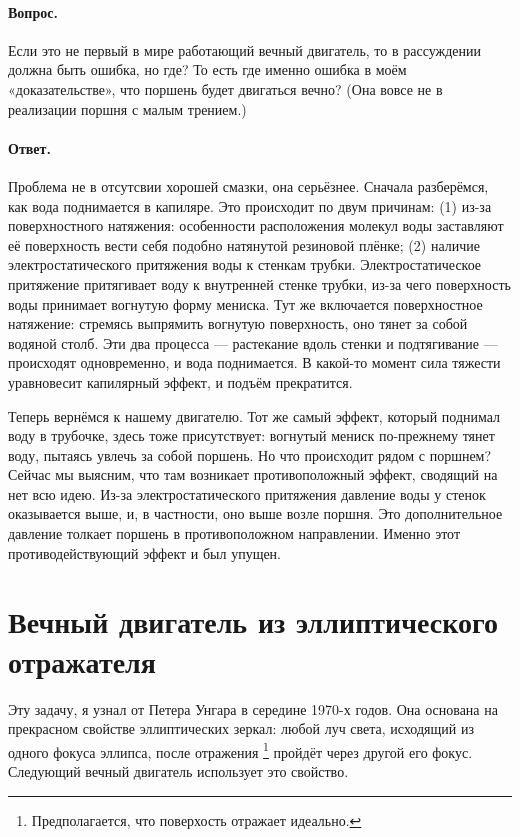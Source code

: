 \paragraph{Вопрос.}
Если это не первый в мире работающий вечный двигатель, то в рассуждении должна быть ошибка, но где?
То есть где именно ошибка в моём «доказательстве», что поршень будет двигаться вечно?
(Она вовсе не в реализации поршня с малым трением.)

\paragraph{Ответ.}
Проблема не в отсутсвии хорошей смазки, она серьёзнее.
Сначала разберёмся, как вода поднимается в капиляре.
Это происходит по двум причинам:
(1) из-за поверхностного натяжения:
особенности расположения молекул воды заставляют её поверхность вести себя подобно натянутой резиновой плёнке;
(2) наличие электростатического притяжения воды к стенкам трубки.
Электростатическое притяжение притягивает воду к внутренней стенке трубки, из-за чего поверхность воды принимает вогнутую форму мениска.
Тут же включается поверхностное натяжение: стремясь выпрямить вогнутую поверхность, оно тянет за собой водяной столб.
Эти два процесса --- растекание вдоль стенки и подтягивание --- происходят одновременно, и вода поднимается.
В какой-то момент сила тяжести уравновесит капилярный эффект, и подъём прекратится.

Теперь вернёмся к нашему двигателю.
Тот же самый эффект, который поднимал воду в трубочке, здесь тоже присутствует: вогнутый мениск по-прежнему тянет воду, пытаясь увлечь за собой поршень.
Но что происходит рядом с поршнем?
Сейчас мы выясним, что там возникает противоположный эффект, сводящий на нет всю идею.
Из-за электростатического притяжения давление воды у стенок оказывается выше, и, в частности, оно выше возле поршня.
Это дополнительное давление толкает поршень в противоположном направлении.
Именно этот противодействующий эффект и был упущен.

\section{Вечный двигатель из эллиптического отражателя}

Эту задачу, я узнал от Петера Унгара в середине
1970-х годов.
Она основана на прекрасном свойстве эллиптических зеркал:
любой луч света, исходящий из одного фокуса эллипса,
после отражения%
\footnote{Предполагается, что поверхость отражает идеально.}
пройдёт через другой его фокус.
Следующий вечный двигатель использует это свойство.


